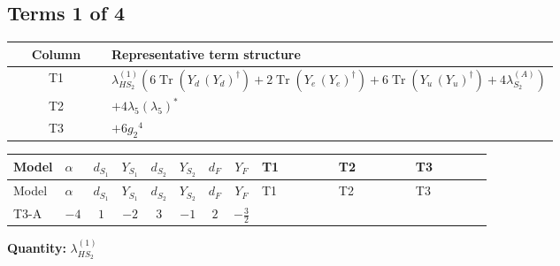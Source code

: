 \documentclass[8pt]{article}
\begin{document}
\begin{landscape}
\subsection*{Terms 1 of 4}
\begin{center}
\begin{tabular}{@{}c >{\raggedright\arraybackslash}p{0.82\linewidth}@{}}
\toprule
Column & Representative term structure \\
\midrule
T1 & \(\displaystyle {\lambda_{HS_2}^{(1)}} (6 \operatorname{Tr}\!\left({Y_d}\,\left({Y_d}\right)^{\dagger}\right)+2 \operatorname{Tr}\!\left({Y_e}\,\left({Y_e}\right)^{\dagger}\right)+6 \operatorname{Tr}\!\left({Y_u}\,\left({Y_u}\right)^{\dagger}\right)+4 {\lambda_{S_2}^{(A)}})\) \\
\midrule
T2 & \(\displaystyle +4 {\lambda_5} \left({\lambda_5}\right)^{*}\) \\
\midrule
T3 & \(\displaystyle +6 {g_2}^4\) \\
\midrule
\bottomrule
\end{tabular}
\end{center}
\smallskip
\tiny
\begin{longtable}{@{}llcccccc >{\raggedright\arraybackslash}p{0.21\linewidth} >{\raggedright\arraybackslash}p{0.21\linewidth} >{\raggedright\arraybackslash}p{0.21\linewidth}@{}}
\toprule
Model & $\alpha$ & $d_{S_1}$ & $Y_{S_1}$ & $d_{S_2}$ & $Y_{S_2}$ & $d_F$ & $Y_F$ & T1 & T2 & T3 \\
\midrule
\endfirsthead
\toprule
Model & $\alpha$ & $d_{S_1}$ & $Y_{S_1}$ & $d_{S_2}$ & $Y_{S_2}$ & $d_F$ & $Y_F$ & T1 & T2 & T3 \\
\midrule
\endhead
T3-A & $-4$ & $1$ & $-2$ & $3$ & $-1$ & $2$ & $-\frac{3}{2}$ & \scriptsize\adjustbox{max width=\linewidth}{$\begin{gathered} {\lambda_{HS_2}^{(1)}} (6 \operatorname{Tr}\!\left({Y_d}\,\left({Y_d}\right)^{\dagger}\right)+2 \operatorname{Tr}\!\left({Y_e}\,\left({Y_e}\right)^{\dagger}\right)+6 \operatorname{Tr}\!\left({Y_u}\,\left({Y_u}\right)^{\dagger}\right)+4 {\lambda_{S_2}^{(A)}})\end{gathered}$} & \scriptsize\adjustbox{max width=\linewidth}{$\begin{gathered} +4 {\lambda_5} \left({\lambda_5}\right)^{*}\end{gathered}$} & \scriptsize\adjustbox{max width=\linewidth}{$\begin{gathered} +6 {g_2}^4\end{gathered}$} \\
\midrule
\bottomrule
\end{longtable}
\clearpage
\noindent\textbf{Quantity: }$\lambda_{HS_2}^{(1)}$\par\smallskip

\end{landscape}
\end{document}
